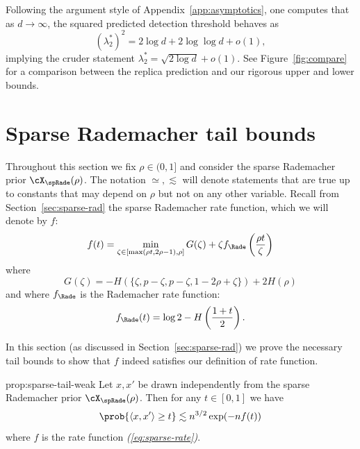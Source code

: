 \documentclass{article}
\begin{document}
Following the argument style of Appendix~\ref{app:asymptotics}, one computes that as $d \to \infty$, the squared predicted detection threshold behaves as
$$ (\lambda_2^*)^2 = 2 \log d + 2 \log \log d + o(1), $$
implying the cruder statement $\lambda_2^* = \sqrt{2 \log d} + o(1)$. See Figure~\ref{fig:compare} for a comparison between the replica prediction and our rigorous upper and lower bounds.





\section{Sparse Rademacher tail bounds}
\label{app:sparse-rad-tail}

Throughout this section we fix $\rho \in (0,1]$ and consider the sparse Rademacher prior $\cX_\spRade(\rho)$. The notation $\simeq, \lesssim$ will denote statements that are true up to constants that may depend on $\rho$ but not on any other variable. Recall from Section~\ref{sec:sparse-rad} the sparse Rademacher rate function, which we will denote by $f$:
\begin{equation}
\label{eq:sparse-rate}
f(t) = \min_{\zeta \in [\max(\rho t,2\rho-1),\rho]} G(\zeta) + \zeta f_\Rade\left(\frac{\rho t}{\zeta}\right)
\end{equation}
where
$$G(\zeta) = -H(\{\zeta,p-\zeta,p-\zeta,1-2\rho+\zeta\}) + 2H(\rho)$$
and where $f_\Rade$ is the Rademacher rate function:
$$f_\Rade(t) = \log 2 - H\left(\frac{1+t}{2}\right).$$

In this section (as discussed in Section~\ref{sec:sparse-rad}) we prove the necessary tail bounds to show that $f$ indeed satisfies our definition of rate function.

\begin{repproposition}{prop:sparse-tail-weak}
Let $x,x'$ be drawn independently from the sparse Rademacher prior $\cX_\spRade(\rho)$. Then for any $t \in [0,1]$ we have
$$\prob{\langle x,x' \rangle \ge t} \lesssim n^{3/2} \exp(-n f(t))$$
where $f$ is the rate function \emph{(\ref{eq:sparse-rate})}.
\end{repproposition}
\end{document}
